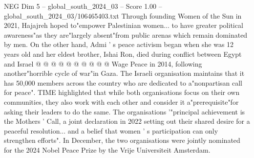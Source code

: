 \begin{textsample}{NEG Dim 5 – global\_south\_2024\_03 – Score 1.00 – global\_south\_2024\_03/106465403.txt}
Through founding Women of the Sun in 2021, Hajajreh hoped to"empower Palestinian women... to have greater political awareness"as they are"largely absent"from public arenas which remain dominated by men.
On the other hand, Admi ' s peace activism began when she was 12 years old and her eldest brother, Ishai Ron, died during conflict between Egypt and Israel @ @ @ @ @ @ @ @ @ @ Wage Peace in 2014, following another"horrible cycle of war"in Gaza.
The Israeli organisation maintains that it has 50,000 members across the country who are dedicated to a"nonpartisan call for peace".
TIME highlighted that while both organisations focus on their own communities, they also work with each other and consider it a"prerequisite"for asking their leaders to do the same.
The organisations '"principal achievement is the Mothers ' Call, a joint declaration in 2022 setting out their shared desire for a peaceful resolution... and a belief that women ' s participation can only strengthen efforts".
In December, the two organisations were jointly nominated for the 2024 Nobel Peace Prize by the Vrije Universiteit Amsterdam.

\end{textsample}
